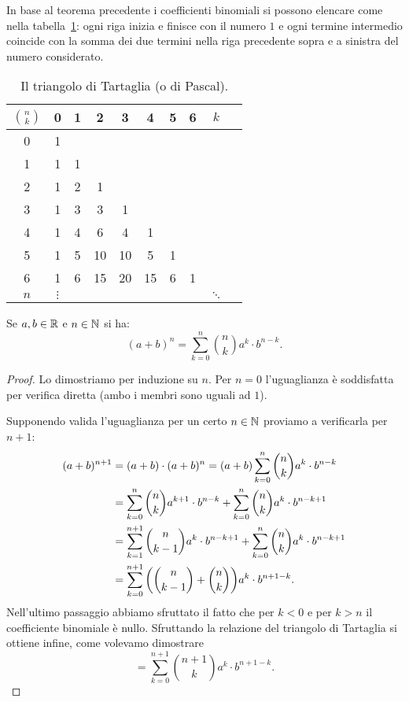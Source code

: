 In base al teorema precedente i coefficienti binomiali si possono
elencare come nella tabella~\ref{tab:binomiali}:
ogni riga inizia e finisce con il numero $1$
e ogni termine intermedio coincide con la somma dei
due termini nella riga precedente sopra e
a sinistra del numero considerato.

\begin{table}
\begin{tabular}{c|ccccccccc}
$\displaystyle{n \choose k}$& 0 & 1 & 2 & 3 & 4 & 5 & 6 & $k$ &\\ \hline
  0 & 1 &   &   &   &   &   &   & &\\
  1 & 1 & 1 &   &   &   &   &   & &\\
  2 & 1 & 2 & 1 &   &   &   &   & &\\
  3 & 1 & 3 & 3 & 1 &   &   &   & &\\
  4 & 1 & 4 & 6 & 4 & 1 &   &   & &\\
  5 & 1 & 5 & 10& 10& 5 & 1 &   & &\\
  6 & 1 & 6 & 15& 20& 15& 6 & 1 & &\\
$n$ &$\vdots$&&   &   &   &   &   & $\ddots$ &
\end{tabular}
\caption{Il triangolo di Tartaglia (o di Pascal).}
\label{tab:binomiali}
\end{table}

\begin{theorem}
\mymark{***}
Se $a,b\in \mathbb R$ e $n\in \mathbb N$ si ha:
\[
(a+b)^n = \sum_{k=0}^n {n \choose k} a^k \cdot b^{n-k}.
\]
\end{theorem}
%
\begin{proof}
Lo dimostriamo per induzione su $n$.
Per $n=0$ l'uguaglianza è soddisfatta per verifica diretta (ambo i membri sono uguali ad $1$).

Supponendo valida l'uguaglianza per un certo $n\in \mathbb N$ proviamo a verificarla
per $n+1$:
\begin{align*}
(a+b)^{n+1}
&= (a+b)\cdot (a+b)^n
 = (a+b) \sum_{k=0}^n {n \choose k} a^k \cdot b^{n-k}\\
&= \sum_{k=0}^n {n \choose k} a^{k+1}\cdot b^{n-k}
   + \sum_{k=0}^n {n \choose k} a^k \cdot b^{n-k+1} \\
&= \sum_{k=1}^{n+1} {n \choose k-1} a^k \cdot b^{n-k+1}
   + \sum_{k=0}^n {n \choose k}a^k \cdot b^{n-k+1} \\
&= \sum_{k=0}^{n+1} {\left( {n \choose k-1} + {n \choose k} \right)} a^k \cdot b^{n+1-k}.
\end{align*}
Nell'ultimo passaggio abbiamo sfruttato il fatto che per $k<0$ e per $k>n$ il coefficiente binomiale è nullo.
Sfruttando la relazione del triangolo di Tartaglia si ottiene infine,
come volevamo dimostrare
\[
  = \sum_{k=0}^{n+1}{n+1 \choose k} a^k \cdot b^{n+1-k}.
\]
\end{proof}

